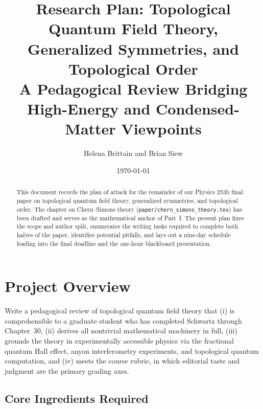 \documentclass[11pt]{article}
\title{Research Plan: Topological Quantum Field Theory,\\
Generalized Symmetries, and Topological Order\\
{\normalsize A Pedagogical Review Bridging High-Energy and Condensed-Matter Viewpoints}}
\author{Helena Brittain and Brian Siew}
\date{\today}
\begin{document}
\maketitle

\begin{abstract}
This document records the plan of attack for the remainder of our Physics 253b final
paper on topological quantum field theory, generalized symmetries, and topological order.
The chapter on Chern--Simons theory (\texttt{paper/chern\_simons\_theory.tex}) has been
drafted and serves as the mathematical anchor of Part~I. The present plan fixes the scope
and author split, enumerates the writing tasks required to complete both halves of the
paper, identifies potential pitfalls, and lays out a nine-day schedule leading into
the final deadline and the one-hour blackboard presentation.
\end{abstract}

\tableofcontents
\newpage

\section{Project Overview}\label{sec:overview}

\begin{goalbox}
Write a pedagogical review of topological quantum field theory that (i) is comprehensible
to a graduate student who has completed Schwartz \cite{Schwartz2014QFT} through Chapter~30,
(ii) derives all nontrivial mathematical machinery in full, (iii) grounds the theory in
experimentally accessible physics via the fractional quantum Hall effect, anyon
interferometry experiments, and topological quantum computation, and (iv) meets the
course rubric, in which editorial taste and judgment are the primary grading axes.
\end{goalbox}

\subsection{Core Ingredients Required}
\end{document}
